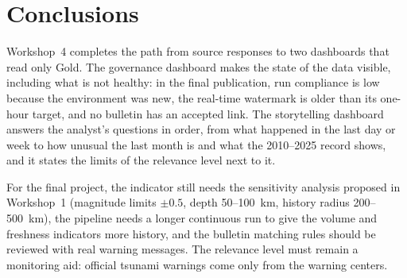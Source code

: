 \documentclass[a4paper,11pt,oneside]{book}
\begin{document}
\chapter{Conclusions}
Workshop~4 completes the path from source responses to two dashboards that read only Gold. The governance dashboard makes the state of the data visible, including what is not healthy: in the final publication, run compliance is low because the environment was new, the real-time watermark is older than its one-hour target, and no bulletin has an accepted link. The storytelling dashboard answers the analyst's questions in order, from what happened in the last day or week to how unusual the last month is and what the 2010--2025 record shows, and it states the limits of the relevance level next to it.

For the final project, the indicator still needs the sensitivity analysis proposed in Workshop~1 (magnitude limits $\pm0.5$, depth 50--100~km, history radius 200--500~km), the pipeline needs a longer continuous run to give the volume and freshness indicators more history, and the bulletin matching rules should be reviewed with real warning messages. The relevance level must remain a monitoring aid: official tsunami warnings come only from the warning centers.
\end{document}
